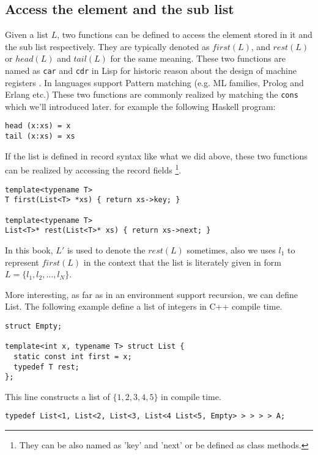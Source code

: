 \documentclass{article}
\begin{document}
\subsection{Access the element and the sub list}
Given a list $L$, two functions can be defined to access the element stored in it and
the sub list respectively. They are typically denoted as $first(L)$, and $rest(L)$ or
$head(L)$ and $tail(L)$ for the same meaning.
These two functions are named as \verb|car| and \verb|cdr| in Lisp for historic reason
about the design of machine registers \cite{SICP}. In languages support Pattern matching 
(e.g. ML families, Prolog and Erlang etc.)
These two functions are commonly realized by matching the \verb|cons| which we'll introduced
later. for example the following Haskell program:

\lstset{language=Haskell}
\begin{lstlisting}
head (x:xs) = x
tail (x:xs) = xs
\end{lstlisting}

If the list is defined in record syntax like what we did above, these two functions can 
be realized by accessing the record fields \footnote{They can be also named as 'key' and 'next'
or be defined as class methods.}.

\lstset{language=C++}
\begin{lstlisting}
template<typename T>
T first(List<T> *xs) { return xs->key; }

template<typename T>
List<T>* rest(List<T>* xs) { return xs->next; }
\end{lstlisting}

In this book, $L'$ is used to denote the $rest(L)$ sometimes, also we uses $l_1$ to represent
$first(L)$ in the context that the list is literately given in form $L = \{ l_1, l_2, ..., l_N\}$.

More interesting, as far as in an environment support recursion, we can define List. The following
example define a list of integers in C++ compile time.

\lstset{language=C++}
\begin{lstlisting}
struct Empty;

template<int x, typename T> struct List {
  static const int first = x;
  typedef T rest;
};
\end{lstlisting}

This line constructs a list of $\{1, 2, 3, 4, 5\}$ in compile time.

\begin{lstlisting}
typedef List<1, List<2, List<3, List<4 List<5, Empty> > > > > A;
\end{lstlisting}
\end{document}
